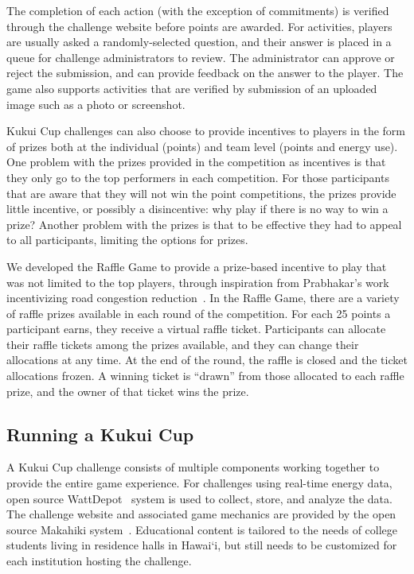 \documentclass{sigchi}
\newcommand{\Hawaii}{Hawai`i\xspace}
\begin{document}
The completion of each action (with the exception of commitments) is verified through the challenge website before points are awarded. For activities, players are usually asked a randomly-selected question, and their answer is placed in a queue for challenge administrators to review. The administrator can approve or reject the submission, and can provide feedback on the answer to the player. The game also supports activities that are verified by submission of an uploaded image such as a photo or screenshot.

Kukui Cup challenges can also choose to provide incentives to players in the form of prizes both at the individual (points) and team level (points and energy use). One problem with the prizes provided in the competition as incentives is that they only go to the top performers in each competition. For those participants that are aware that they will not win the point competitions, the prizes provide little incentive, or possibly a disincentive: why play if there is no way to win a prize? Another problem with the prizes is that to be effective they had to appeal to all participants, limiting the options for prizes.

We developed the Raffle Game to provide a prize-based incentive to play that was not limited to the top players, through inspiration from Prabhakar's work incentivizing road congestion reduction~\cite{Merugu2009}. In the Raffle Game, there are a variety of raffle prizes available in each round of the competition. For each 25 points a participant earns, they receive a virtual raffle ticket. Participants can allocate their raffle tickets among the prizes available, and they can change their allocations at any time. At the end of the round, the raffle is closed and the ticket allocations frozen. A winning ticket is ``drawn'' from those allocated to each raffle prize, and the owner of that ticket wins the prize.

\subsection{Running a Kukui Cup}

A Kukui Cup challenge consists of multiple components working together to provide the entire game experience. For challenges using real-time energy data, open source WattDepot~\cite{csdl2-10-05} system is used to collect, store, and analyze the data. The challenge website and associated game mechanics are provided by the open source Makahiki system~\cite{csdl2-11-07}. Educational content is tailored to the needs of college students living in residence halls in \Hawaii, but still needs to be customized for each institution hosting the challenge.
\end{document}
